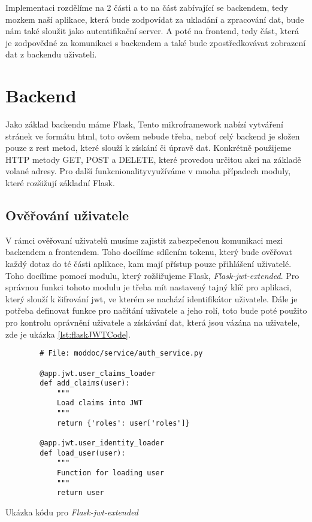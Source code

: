 Implementaci rozdělíme na 2 části a to na část zabívající se backendem, tedy mozkem naší aplikace, která bude zodpovídat
za ukladání a zpracování dat, bude nám také sloužit jako autentifikační server. A poté na frontend, tedy část, která
je zodpovědné za komunikaci s backendem a také bude zpostředkovávat zobrazení dat z backendu uživateli.

\section{Backend}

Jako základ backendu máme Flask,  \cite{flaskDoc}
Tento mikroframework nabízí vytváření stránek ve formátu \gls{html}, toto ovšem nebude třeba, \mbox{neboť} celý backend je složen pouze z \gls{rest} metod,
které slouží k získání či úpravě dat. Konkrétně použijeme HTTP metody GET, POST a DELETE, které provedou určitou akci na základě volané adresy.
Pro další funkcnionality\linebreak využíváme v mnoha případech moduly, které rozšižují základní Flask.

\subsection{Ověřování uživatele}

V rámci ověřovaní uživatelů musíme zajistit zabezpečenou komunikaci mezi backendem a frontendem. Toho docílíme sdílením tokenu, který bude ověřovat
každý dotaz do té části aplikace, kam mají přístup pouze přihlášení uživatelé. Toho docílíme pomocí modulu, který rožšiřujeme Flask,
\textit{Flask-jwt-extended}. Pro správnou funkci tohoto modulu je třeba mít nastavený tajný klíč pro aplikaci, který slouží k šifrování \gls{jwt},
ve kterém se nachází identifikátor uživatele. Dále je potřeba definovat funkce pro načítání uživatele a jeho rolí, toto bude poté použito pro kontrolu
oprávnění uživatele a získávání dat, která jsou vázána na uživatele, zde je ukázka \ref{lst:flaskJWTCode}.

\begin{listing}
    \begin{verbatim}
        # File: moddoc/service/auth_service.py

        @app.jwt.user_claims_loader
        def add_claims(user):
            """
            Load claims into JWT
            """
            return {'roles': user['roles']}

        @app.jwt.user_identity_loader
        def load_user(user):
            """
            Function for loading user
            """
            return user
    \end{verbatim}
    \caption{Ukázka kódu pro \textit{Flask-jwt-extended}}
    \label{lst:flaskJWTCode}
\end{listing}

